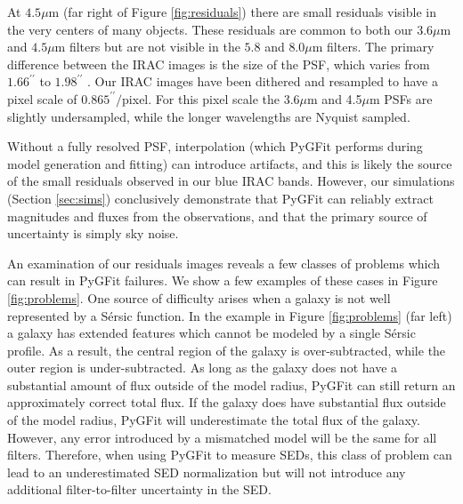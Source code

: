 \documentclass[preprint]{aastex}
\newcommand{\sersic}{S\'{e}rsic}
\newcommand{\pygfit}{PyGFit}
\begin{document}
At $4.5\mu$m (far right of Figure \ref{fig:residuals}) there are small residuals visible in the very centers of many objects.  These residuals are common to both our $3.6\mu$m and $4.5\mu$m filters but are not visible in the $5.8$ and $8.0\mu$m filters.  The primary difference between the IRAC images is the size of the PSF, which varies from $1.66^{\prime\prime}$ to $1.98^{\prime\prime}$ \citep{irac}. Our IRAC images have been dithered and resampled to have a pixel scale of $0.865^{\prime\prime}/$pixel. For this pixel scale the 3.6$\mu$m and 4.5$\mu$m PSFs are slightly undersampled, while the longer wavelengths are Nyquist sampled.

Without a fully resolved PSF, interpolation (which \pygfit{} performs during model generation and fitting) can introduce artifacts, and this is likely the source of the small residuals observed in our blue IRAC bands.  However, our simulations (Section \ref{sec:sims}) conclusively demonstrate that \pygfit{} can reliably extract magnitudes and fluxes from the observations, and that the primary source of uncertainty is simply sky noise.

An examination of our residuals images reveals a few classes of problems which can result in \pygfit{} failures.  We show a few examples of these cases in Figure \ref{fig:problems}.  One source of difficulty arises when a galaxy is not well represented by a \sersic{} function.  In the example in Figure \ref{fig:problems} (far left) a galaxy has extended features which cannot be modeled by a single \sersic{} profile.  As a result, the central region of the galaxy is over-subtracted, while the outer region is under-subtracted.  As long as the galaxy does not have a substantial amount of flux outside of the model radius, \pygfit{} can still return an approximately correct total flux.  If the galaxy does have substantial flux outside of the model radius, \pygfit{} will underestimate the total flux of the galaxy.  However, any error introduced by a mismatched model will be the same for all filters.  Therefore, when using \pygfit{} to measure SEDs, this class of problem can lead to an underestimated SED normalization but will not introduce any additional filter-to-filter uncertainty in the SED.
\end{document}
